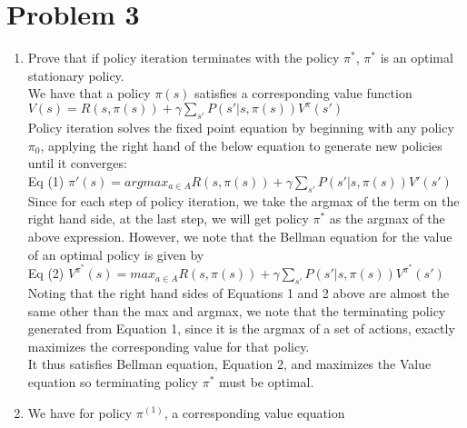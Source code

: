 \documentclass[12pt,letterpaper]{article}
\begin{document}
\section*{Problem 3}
\begin{enumerate}[label={(\alph*) }]
        \item Prove that if policy iteration terminates with the policy $\pi^*$, $\pi^*$ is an optimal stationary policy. \\

We have that a policy $\pi(s)$ satisfies a corresponding value function \\ $\displaystyle{V(s) = R(s, \pi(s)) + \gamma \sum_{s'}{P(s' | s, \pi(s))V^{\pi}(s')}}$ \\

Policy iteration solves the fixed point equation by beginning with any policy $\pi_0$, applying the right hand of the below equation to generate new policies until it converges: \\

Eq (1) $\displaystyle{\pi '(s) = argmax_{a \in A} R(s, \pi(s)) + \gamma \sum_{s'}{P(s' | s, \pi(s))V'(s')}}$ \\

Since for each step of policy iteration, we take the argmax of the term on the right hand side, at the last step, we will get policy $\pi^*$ as the argmax of the above expression. However, we note that the Bellman equation for the value of an optimal policy is given by \\

Eq (2) $\displaystyle{V^{\pi^*}(s) = max_{a \in A} R(s, \pi(s)) + \gamma \sum_{s'}{P(s' | s, \pi(s))V^{\pi^*}(s')}}$ \\

Noting that the right hand sides of Equations 1 and 2 above are almost the same other than the max and argmax, we note that the terminating policy generated from Equation 1, since it is the argmax of a set of actions, exactly maximizes the corresponding value for that policy. \\

It thus satisfies Bellman equation, Equation 2, and maximizes the Value equation so terminating policy $\pi^*$ must be optimal. \\

\item

We have for policy $\pi^{(1)}$, a corresponding value equation \\


\end{enumerate}
\end{document}
